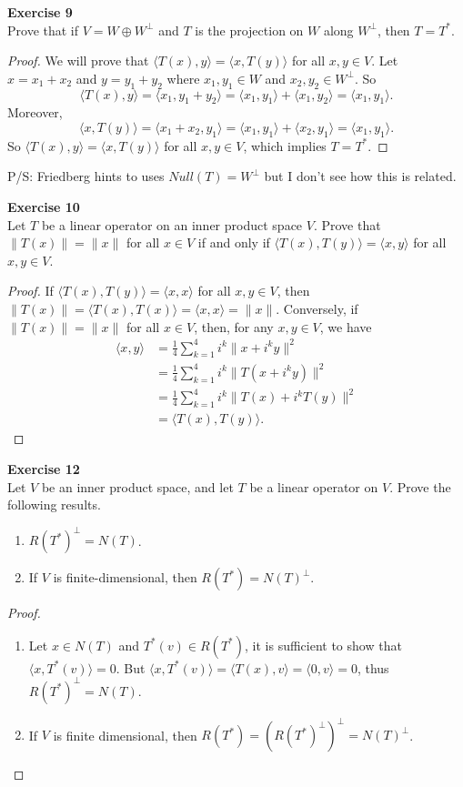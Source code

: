 \documentclass[12pt, a4paper]{article}
\theoremstyle{plain}
\newenvironment{exercise}[2][Exercise]
    { \begin{mdframed}[backgroundcolor=gray!20] \textbf{#1 #2} \\}
    {  \end{mdframed}}
\begin{document}
\begin{exercise}{9}
Prove that if $V=W\oplus W^\perp$ and $T$ is the projection on $W$ along $W^\perp$, then $T=T^*$.
\end{exercise}
	\begin{proof}
	We will prove that $\langle{T(x),y}\rangle = \langle{x,T(y)}\rangle$ for all $x,y\in V$. Let $x=x_1+x_2$ and $y=y_1+y_2$ where $x_1,y_1\in W$ and $x_2,y_2\in W^\perp$. So 
	\[
	\langle{T(x),y}\rangle = \langle{x_1,y_1+y_2}\rangle = \langle{x_1,y_1}\rangle + \langle{x_1,y_2}\rangle = \langle{x_1,y_1}\rangle.
	\]
	Moreover,
	\[
	\langle{x,T(y)}\rangle = \langle{x_1+x_2,y_1}\rangle = \langle{x_1,y_1}\rangle + \langle{x_2,y_1}\rangle = \langle{x_1,y_1}\rangle.
	\]
	So $\langle{T(x),y}\rangle = \langle{x,T(y)}\rangle$ for all $x,y\in V$, which implies $T=T^*$.
	\end{proof}
	P/S: Friedberg hints to uses $Null(T) = W^\perp$ but I don't see how this is related.

\begin{exercise}{10}
Let $T$ be a linear operator on an inner product space $V$. Prove that $\|T(x)\|=\|x\|$ for all $x\in V$ if and only if $\langle{T(x),T(y)}\rangle = \langle{x,y}\rangle$ for all $x,y\in V$.
\end{exercise}
	\begin{proof}
	If $\langle{T(x),T(y)}\rangle = \langle{x,x}\rangle$ for all $x,y\in V$, then $\|T(x)\|=\langle{T(x),T(x)}\rangle = \langle{x,x}\rangle = \|x\|$. Conversely, if $\|T(x)\|=\|x\|$ for all $x\in V$, then, for any $x,y\in V$, we have
	\begin{align*}
	\langle{x,y}\rangle &= \frac{1}{4}\sum_{k=1}^{4}{i^k\|x+i^ky\|^2}\\
	&=\frac{1}{4}\sum_{k=1}^{4}{i^k\|T(x+i^ky)\|^2}\\
	&=\frac{1}{4}\sum_{k=1}^{4}{i^k\|T(x)+i^kT(y)\|^2}\\
	&=\langle{T(x),T(y)}\rangle.
	\end{align*}
	\end{proof}

\pagebreak

\begin{exercise}{12}
Let $V$ be an inner product space, and let $T$ be a linear operator on $V$. Prove the following results.
\begin{enumerate}[label=(\alph*)]
\item $R(T^*)^\perp = N(T)$.
\item If $V$ is finite-dimensional, then $R(T^*)=N(T)^\perp$.
\end{enumerate}
\end{exercise}
	\begin{proof}
	\hfill
	\begin{enumerate}[label=(\alph*)]
	\item Let $x\in N(T)$ and $T^*(v)\in R(T^*)$, it is sufficient to show that $\langle{x,T^*(v)}\rangle = 0$. But $\langle{x,T^*(v)}\rangle = \langle{T(x),v}\rangle = \langle{0,v}\rangle = 0$, thus $R(T^*)^\perp = N(T)$.
	\item If $V$ is finite dimensional, then $R(T^*)=(R(T^*)^\perp)^\perp = N(T)^\perp$.
	\end{enumerate}
	\end{proof}
\end{document}
